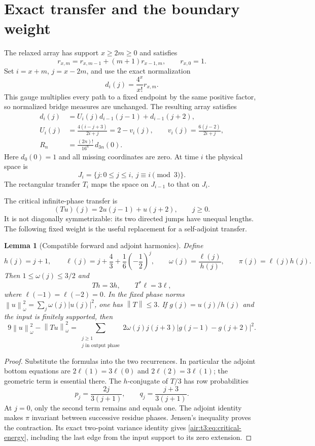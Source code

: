 \documentclass[11pt,letterpaper]{article}
\numberwithin{equation}{section}
\newtheorem{lemma}[theorem]{Lemma}
\theoremstyle{remark}
\newcommand{\norm}[1]{\left\lVert#1\right\rVert}
\begin{document}
\section{Exact transfer and the boundary weight}
The relaxed array has support $x\ge2m\ge0$ and satisfies
\[
r_{x,m}=r_{x,m-1}+(m+1)r_{x-1,m},\qquad r_{x,0}=1.
\]
Set $i=x+m$, $j=x-2m$, and use the exact normalization
\[
d_i(j)=\frac{4^x}{x!}r_{x,m}.
\]
This gauge multiplies every path to a fixed endpoint by the same positive factor, so normalized bridge measures are unchanged. The resulting array satisfies
\begin{align}
d_i(j)&=U_i(j)d_{i-1}(j-1)+d_{i-1}(j+2),\label{air:t3:eq:transfer}\\
U_i(j)&=\frac{4(i-j+3)}{2i+j}
      =2-v_i(j),\qquad v_i(j)=\frac{6(j-2)}{2i+j},\label{air:t3:eq:U}\\
R_n&=\frac{(2n)!}{16^n}\,d_{3n}(0).\label{air:t3:eq:factorial}
\end{align}
Here $d_0(0)=1$ and all missing coordinates are zero. At time $i$ the physical space is
\[
J_i=\{j:0\le j\le i,\ j\equiv i\pmod3\}.
\]
The rectangular transfer $T_i$ maps the space on $J_{i-1}$ to that on $J_i$.

The critical infinite-phase transfer is
\[
(Tu)(j)=2u(j-1)+u(j+2),\qquad j\ge0.
\]
It is not diagonally symmetrizable: its two directed jumps have unequal lengths. The following fixed weight is the useful replacement for a self-adjoint transfer.

\begin{lemma}[Compatible forward and adjoint harmonics]\label{air:t3:lem:harmonic}
Define
\[
h(j)=j+1,\qquad
\ell(j)=j+\frac43+\frac16\left(-\frac12\right)^j,\qquad
\omega(j)=\frac{\ell(j)}{h(j)},\qquad \pi(j)=\ell(j)h(j).
\]
Then $1\le\omega(j)\le3/2$ and
\[
Th=3h,\qquad T^*\ell=3\ell,
\]
where $\ell(-1)=\ell(-2)=0$. In the fixed phase norms
$\norm{u}_\omega^2=\sum_j\omega(j)|u(j)|^2$, one has $\norm{T}\le3$.
If $g(j)=u(j)/h(j)$ and the input is finitely supported, then
\begin{equation}\label{air:t3:eq:critical-energy}
9\norm{u}_\omega^2-\norm{Tu}_\omega^2
=\sum_{\substack{j\ge1\\j\text{ in output phase}}}
2\omega(j)j(j+3)|g(j-1)-g(j+2)|^2.
\end{equation}
\end{lemma}
\begin{proof}
Substitute the formulas into the two recurrences. In particular the adjoint bottom equations are $2\ell(1)=3\ell(0)$ and $2\ell(2)=3\ell(1)$; the geometric term is essential there. The $h$-conjugate of $T/3$ has row probabilities
\[
p_j=\frac{2j}{3(j+1)},\qquad q_j=\frac{j+3}{3(j+1)}.
\]
At $j=0$, only the second term remains and equals one. The adjoint identity makes $\pi$ invariant between successive residue phases. Jensen's inequality proves the contraction. Its exact two-point variance identity gives \eqref{air:t3:eq:critical-energy}, including the last edge from the input support to its zero extension.
\end{proof}
\end{document}
